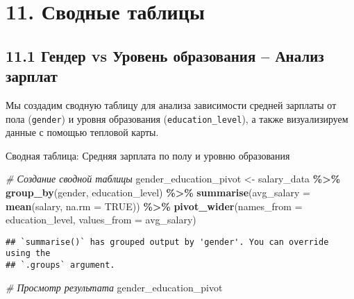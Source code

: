 \documentclass[
]{article}
\newenvironment{Shaded}{\begin{snugshade}}{\end{snugshade}}
\newcommand{\AttributeTok}[1]{\textcolor[rgb]{0.13,0.29,0.53}{#1}}
\newcommand{\CommentTok}[1]{\textcolor[rgb]{0.56,0.35,0.01}{\textit{#1}}}
\newcommand{\ConstantTok}[1]{\textcolor[rgb]{0.56,0.35,0.01}{#1}}
\newcommand{\FunctionTok}[1]{\textcolor[rgb]{0.13,0.29,0.53}{\textbf{#1}}}
\newcommand{\NormalTok}[1]{#1}
\newcommand{\OtherTok}[1]{\textcolor[rgb]{0.56,0.35,0.01}{#1}}
\newcommand{\SpecialCharTok}[1]{\textcolor[rgb]{0.81,0.36,0.00}{\textbf{#1}}}
\begin{document}
\section{11. Сводные
таблицы}\label{ux441ux432ux43eux434ux43dux44bux435-ux442ux430ux431ux43bux438ux446ux44b}

\subsection{11.1 Гендер vs Уровень образования -- Анализ
зарплат}\label{ux433ux435ux43dux434ux435ux440-vs-ux443ux440ux43eux432ux435ux43dux44c-ux43eux431ux440ux430ux437ux43eux432ux430ux43dux438ux44f-ux430ux43dux430ux43bux438ux437-ux437ux430ux440ux43fux43bux430ux442}

Мы создадим сводную таблицу для анализа зависимости средней зарплаты от
пола (\texttt{gender}) и уровня образования (\texttt{education\_level}),
а также визуализируем данные с помощью тепловой карты.

Сводная таблица: Средняя зарплата по полу и уровню образования

\begin{Shaded}
\begin{Highlighting}[]
\CommentTok{\# Создание сводной таблицы}
\NormalTok{gender\_education\_pivot }\OtherTok{\textless{}{-}}\NormalTok{ salary\_data }\SpecialCharTok{\%\textgreater{}\%}
  \FunctionTok{group\_by}\NormalTok{(gender, education\_level) }\SpecialCharTok{\%\textgreater{}\%}
  \FunctionTok{summarise}\NormalTok{(}\AttributeTok{avg\_salary =} \FunctionTok{mean}\NormalTok{(salary, }\AttributeTok{na.rm =} \ConstantTok{TRUE}\NormalTok{)) }\SpecialCharTok{\%\textgreater{}\%}
  \FunctionTok{pivot\_wider}\NormalTok{(}\AttributeTok{names\_from =}\NormalTok{ education\_level, }\AttributeTok{values\_from =}\NormalTok{ avg\_salary)}
\end{Highlighting}
\end{Shaded}

\begin{verbatim}
## `summarise()` has grouped output by 'gender'. You can override using the
## `.groups` argument.
\end{verbatim}

\begin{Shaded}
\begin{Highlighting}[]
\CommentTok{\# Просмотр результата}
\NormalTok{gender\_education\_pivot}
\end{Highlighting}
\end{Shaded}
\end{document}
